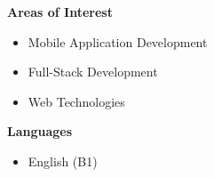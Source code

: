 \documentclass[a4paper,11pt]{article}
\begin{document}
\vspace{0.1em}
\noindent
\begin{minipage}[t]{0.48\textwidth}
    \textbf{Areas of Interest}
    \vspace{0em}
    \begin{itemize}
        \item Mobile Application Development
        \item Full-Stack Development
        \item Web Technologies
    \end{itemize}
\end{minipage}%
\hfill
\begin{minipage}[t]{0.48\textwidth}
    \textbf{Languages}
    \vspace{0em}
    \begin{itemize}
        \item English (B1)
    \end{itemize}
\end{minipage}
\end{document}
